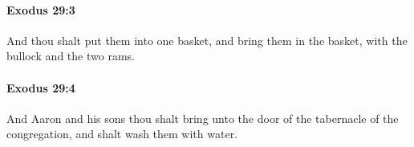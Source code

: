 		\paragraph{Exodus 29:3} %
			\label{EXODUS-29-3}

			And thou shalt put them into one basket, and bring them in the basket, with the bullock and the two rams.


		\paragraph{Exodus 29:4} %
			\label{EXODUS-29-4}

			And Aaron and his sons thou shalt bring unto the door of the tabernacle of the congregation, and shalt wash them with water.


